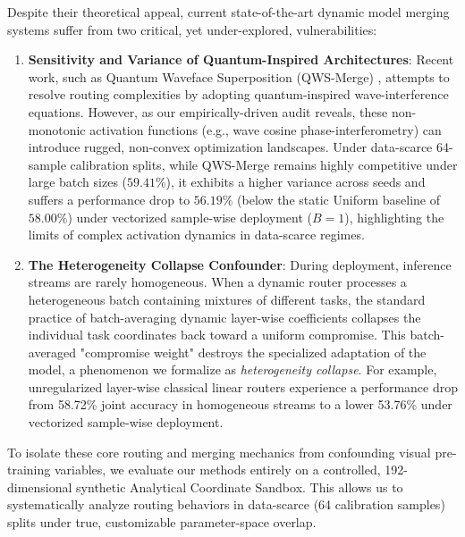 Despite their theoretical appeal, current state-of-the-art dynamic model merging systems suffer from two critical, yet under-explored, vulnerabilities:
\begin{enumerate}
    \item \textbf{Sensitivity and Variance of Quantum-Inspired Architectures}: Recent work, such as Quantum Waveface Superposition (QWS-Merge) \cite{qwsmerge2025}, attempts to resolve routing complexities by adopting quantum-inspired wave-interference equations. However, as our empirically-driven audit reveals, these non-monotonic activation functions (e.g., wave cosine phase-interferometry) can introduce rugged, non-convex optimization landscapes. Under data-scarce 64-sample calibration splits, while QWS-Merge remains highly competitive under large batch sizes ($59.41\%$), it exhibits a higher variance across seeds and suffers a performance drop to $56.19\%$ (below the static Uniform baseline of $58.00\%$) under vectorized sample-wise deployment ($B=1$), highlighting the limits of complex activation dynamics in data-scarce regimes.
    \item \textbf{The Heterogeneity Collapse Confounder}: During deployment, inference streams are rarely homogeneous. When a dynamic router processes a heterogeneous batch containing mixtures of different tasks, the standard practice of batch-averaging dynamic layer-wise coefficients collapses the individual task coordinates back toward a uniform compromise. This batch-averaged "compromise weight" destroys the specialized adaptation of the model, a phenomenon we formalize as \emph{heterogeneity collapse}. For example, unregularized layer-wise classical linear routers experience a performance drop from 58.72\% joint accuracy in homogeneous streams to a lower 53.76\% under vectorized sample-wise deployment.
\end{enumerate}

To isolate these core routing and merging mechanics from confounding visual pre-training variables, we evaluate our methods entirely on a controlled, 192-dimensional synthetic Analytical Coordinate Sandbox. This allows us to systematically analyze routing behaviors in data-scarce (64 calibration samples) splits under true, customizable parameter-space overlap.

